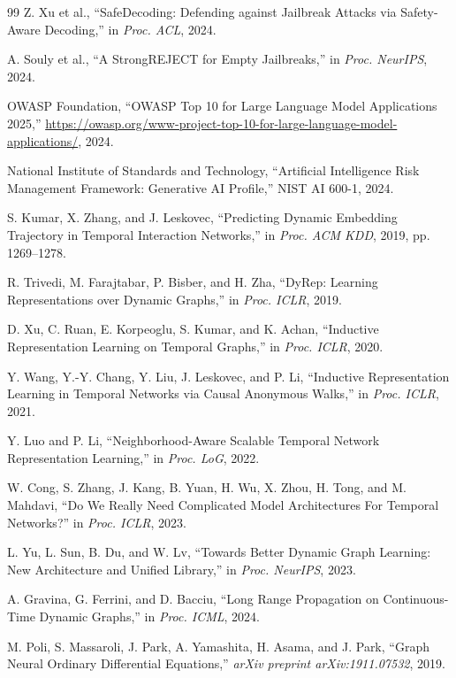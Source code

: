\documentclass[journal]{IEEEtran}
\theoremstyle{plain}
\theoremstyle{definition}
\theoremstyle{remark}
\begin{document}
\begin{thebibliography}{99}
Z. Xu et al., ``SafeDecoding: Defending against Jailbreak Attacks via Safety-Aware Decoding,'' in \textit{Proc. ACL}, 2024.

A. Souly et al., ``A StrongREJECT for Empty Jailbreaks,'' in \textit{Proc. NeurIPS}, 2024.

OWASP Foundation, ``OWASP Top 10 for Large Language Model Applications 2025,'' \url{https://owasp.org/www-project-top-10-for-large-language-model-applications/}, 2024.

National Institute of Standards and Technology, ``Artificial Intelligence Risk Management Framework: Generative AI Profile,'' NIST AI 600-1, 2024.

S. Kumar, X. Zhang, and J. Leskovec, ``Predicting Dynamic Embedding Trajectory in Temporal Interaction Networks,'' in \textit{Proc. ACM KDD}, 2019, pp. 1269--1278.

R. Trivedi, M. Farajtabar, P. Bisber, and H. Zha, ``DyRep: Learning Representations over Dynamic Graphs,'' in \textit{Proc. ICLR}, 2019.

D. Xu, C. Ruan, E. Korpeoglu, S. Kumar, and K. Achan, ``Inductive Representation Learning on Temporal Graphs,'' in \textit{Proc. ICLR}, 2020.

Y. Wang, Y.-Y. Chang, Y. Liu, J. Leskovec, and P. Li, ``Inductive Representation Learning in Temporal Networks via Causal Anonymous Walks,'' in \textit{Proc. ICLR}, 2021.

Y. Luo and P. Li, ``Neighborhood-Aware Scalable Temporal Network Representation Learning,'' in \textit{Proc. LoG}, 2022.

W. Cong, S. Zhang, J. Kang, B. Yuan, H. Wu, X. Zhou, H. Tong, and M. Mahdavi, ``Do We Really Need Complicated Model Architectures For Temporal Networks?'' in \textit{Proc. ICLR}, 2023.

L. Yu, L. Sun, B. Du, and W. Lv, ``Towards Better Dynamic Graph Learning: New Architecture and Unified Library,'' in \textit{Proc. NeurIPS}, 2023.

A. Gravina, G. Ferrini, and D. Bacciu, ``Long Range Propagation on Continuous-Time Dynamic Graphs,'' in \textit{Proc. ICML}, 2024.

M. Poli, S. Massaroli, J. Park, A. Yamashita, H. Asama, and J. Park, ``Graph Neural Ordinary Differential Equations,'' \textit{arXiv preprint arXiv:1911.07532}, 2019.


\end{thebibliography}
\end{document}
